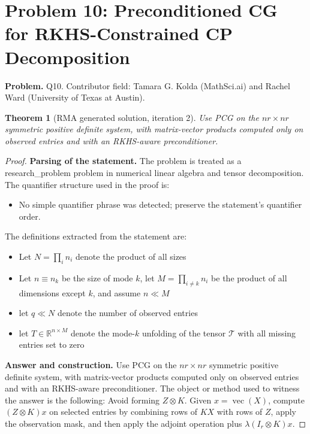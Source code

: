 \documentclass[11pt]{article}
\newtheorem{theorem}{Theorem}
\begin{document}
\section*{Problem 10: Preconditioned CG for RKHS-Constrained CP Decomposition}

\noindent\textbf{Problem.} Q10. Contributor field: Tamara G. Kolda (MathSci.ai) and Rachel Ward (University of Texas at Austin).

\begin{theorem}[RMA generated solution, iteration 2]
Use PCG on the \(nr\times nr\) symmetric positive definite system, with matrix-vector products computed only on observed entries and with an RKHS-aware preconditioner.
\end{theorem}

\begin{proof}
\textbf{Parsing of the statement.}
The problem is treated as a research_problem problem in numerical linear algebra and tensor decomposition.
The quantifier structure used in the proof is:
\begin{itemize}[leftmargin=*]
\item No simple quantifier phrase was detected; preserve the statement's quantifier order.
\end{itemize}
The definitions extracted from the statement are:
\begin{itemize}[leftmargin=*]
\item Let $N = \prod_i n_i$ denote the product of all sizes
\item Let $n \equiv n_k$ be the size of mode $k$, let $M = \prod_{i\neq k} n_i$ be the product of all dimensions except $k$, and assume $n \ll M$
\item let $q \ll N$ denote the number of observed entries
\item let $T \in \mathbb{R}^{n \times M}$ denote the mode-$k$ unfolding of the tensor $\mathcal{T}$ with all missing entries set to zero
\end{itemize}

\textbf{Answer and construction.}
Use PCG on the \(nr\times nr\) symmetric positive definite system, with matrix-vector products computed only on observed entries and with an RKHS-aware preconditioner. The object or method used to witness the answer is the
following: Avoid forming \(Z\otimes K\). Given \(x=\operatorname{vec}(X)\), compute \((Z\otimes K)x\) on selected entries by combining rows of \(KX\) with rows of \(Z\), apply the observation mask, and then apply the adjoint operation plus \(\lambda(I_r\otimes K)x\).


\end{proof}
\end{document}
